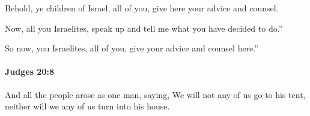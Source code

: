 			\begin{versebox}
					\item[BHS] 
					\item[ASV] Behold, ye children of Israel, all of you, give here your advice and counsel.
					\item[NIV] Now, all you Israelites, speak up and tell me what you have decided to do.”
					\item[NRSV] So now, you Israelites, all of you, give your advice and counsel here.”
			\end{versebox}

		\paragraph{Judges 20:8} %
			\label{JUDGES-20-8}

			And all the people arose as one man, saying, We will not any of us go to his tent, neither will we any of us turn into his house.

